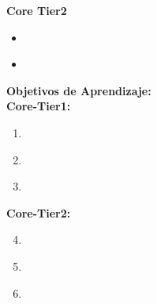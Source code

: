 \noindent \textbf{Core Tier2}
\begin{itemize}
	\item \PLFunctionalProgrammingTopicFunction\label{sec:BOK:PLFunctionalProgrammingTopicFunction}
	\item \PLFunctionalProgrammingTopicDefining\label{sec:BOK:PLFunctionalProgrammingTopicDefining}
\end{itemize}


\noindent \textbf{Objetivos de Aprendizaje:}\\
\noindent \textbf{Core-Tier1:}
\begin{enumerate}
	\setcounter{enumi}{0}
	\item \PLFunctionalProgrammingLOWriteBasic\xspace[\PLFunctionalProgrammingLOWriteBasicLevel]\label{sec:BOK:PLFunctionalProgrammingLOWriteBasic}
	\item \PLFunctionalProgrammingLOWriteUseful\xspace[\PLFunctionalProgrammingLOWriteUsefulLevel]\label{sec:BOK:PLFunctionalProgrammingLOWriteUseful}
	\item \PLFunctionalProgrammingLOCompareAndTheApproach\xspace[\PLFunctionalProgrammingLOCompareAndTheApproachLevel]\label{sec:BOK:PLFunctionalProgrammingLOCompareAndTheApproach}
\end{enumerate}
\noindent \textbf{Core-Tier2:}
\begin{enumerate}
	\setcounter{enumi}{3}
	\item \PLFunctionalProgrammingLOCorrectlyReason\xspace[\PLFunctionalProgrammingLOCorrectlyReasonLevel]\label{sec:BOK:PLFunctionalProgrammingLOCorrectlyReason}
	\item \PLFunctionalProgrammingLOUseFunctional\xspace[\PLFunctionalProgrammingLOUseFunctionalLevel]\label{sec:BOK:PLFunctionalProgrammingLOUseFunctional}
	\item \PLFunctionalProgrammingLODefineAndAndOn\xspace[\PLFunctionalProgrammingLODefineAndAndOnLevel]\label{sec:BOK:PLFunctionalProgrammingLODefineAndAndOn}
\end{enumerate}


